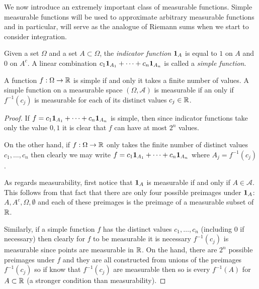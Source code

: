 We now introduce an extremely important class of measurable
functions.  Simple measurable functions will be used to approximate
arbitrary measurable functions and in particular, will serve as the
analogue of Riemann sums when we start to consider integration.

\begin{defn}Given a set $\Omega$ and a set $A
  \subset \Omega$, the \emph{indicator function} $\textbf{1}_{A}$ is
  equal to $1$ on $A$ and $0$ on $A^c$.  A linear combination $c_1
  \textbf{1}_{A_1} + \cdots + c_n \textbf{1}_{A_n}$ is called
  a \emph{simple function}.
\end{defn}

\begin{prop}\label{prop:SimpleFunctions}A function $f : \Omega \to \mathbb{R}$ is simple if and only it
  takes a finite number of values.  A simple function on a measurable space $(\Omega, \mathcal{A})$ is measurable if
  an only if $f^{-1}(c_j)$ is measurable for each of its distinct
  values $c_j \in \mathbb{R}$.
\end{prop}
\begin{proof}
If $f = c_1  \textbf{1}_{A_1} + \cdots + c_n \textbf{1}_{A_n}$
is simple, then since indicator functions take only the value ${0,1}$
it is clear that $f$ can have at most $2^n$ values.

On the other hand, if $f : \Omega \to \mathbb{R}$ only takes the finite
number of distinct values $c_1, \dots, c_n$ then clearly we may write 
$f = c_1  \textbf{1}_{A_1} + \cdots + c_n \textbf{1}_{A_n}$
where $A_j = f^{-1}(c_j)$.

As regards measurability, first notice that $\textbf{1}_{A}$ is
measurable if and only if $A \in  \mathcal{A}$.  This follows from
that fact that there are only four possible preimages under
$\textbf{1}_{A}$: $A, A^c, \Omega, \emptyset$ and each of these
preimages is the preimage of a measurable subset of $\mathbb{R}$.

Similarly, if a simple function $f$ has the distinct values $c_1, \dots,
c_n$ (including $0$ if necessary) then clearly for $f$ to be
measurable it is necessary $f^{-1}(c_j)$ is measurable since points
are measurable in $\mathbb{R}$.   On the hand, there are $2^n$ possible preimages under $f$ and they are all
constructed from unions of the preimages $f^{-1}(c_j)$ so if know that
$f^{-1}(c_j)$ are measurable then so is every $f^{-1}(A)$ for $A
\subset \mathbb{R}$ (a stronger condition than measurability).
\end{proof}

